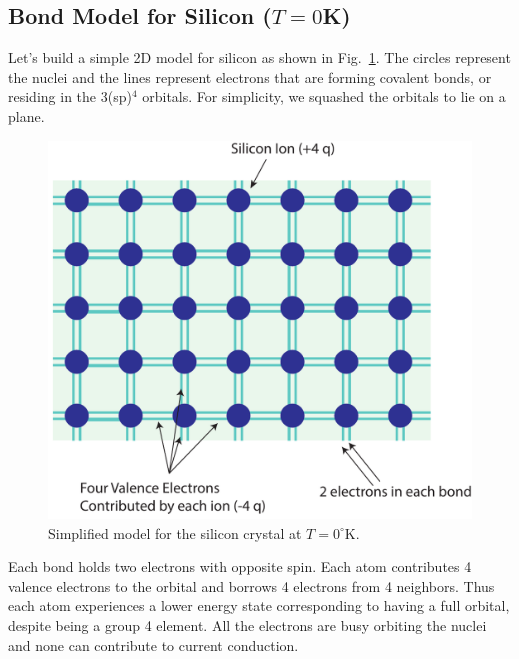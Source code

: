 \subsection{Bond Model for Silicon ($T=0$K)}
Let's build a simple 2D model for silicon as shown in Fig.~\ref{fig:silicon_model}.  The circles represent the nuclei and the lines represent electrons that are forming covalent bonds, or residing in the 3(sp)$^4$ orbitals.  For simplicity, we squashed the orbitals to lie on a plane.
\begin{figure}[tb]
\begin{center}
\includegraphics[width=.65\columnwidth]{silicon_model}
\end{center}
\caption{Simplified model for the  silicon crystal at $T=0^\circ$K. }
\label{fig:silicon_model}
\end{figure}

Each bond holds two electrons with opposite spin.  Each atom contributes 4 valence electrons to the orbital and borrows 4 electrons from 4 neighbors.  Thus each atom experiences a lower energy state corresponding to having a full orbital, despite being a group 4 element.  All the electrons are busy orbiting the nuclei and none can contribute to current conduction.
